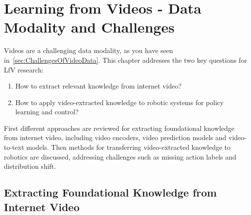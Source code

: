 \chapter{Learning from Videos - Data Modality and Challenges}
\label{chap:LearningFromVideosDataModalityAndChallenges}
\minitoc

Videos are a challenging data modality, as you have seen in~\autoref{sec:ChallengesOfVideoData}. This chapter addresses the two key questions for \ac{LfV} research:
\begin{enumerate}
    \item How to extract relevant knowledge from internet video?
    \item How to apply video-extracted knowledge to robotic systems for policy learning and control?
\end{enumerate}
First different approaches are reviewed for extracting foundational knowledge from internet video, including video encoders, video prediction models and video-to-text models. Then methods for transferring video-extracted knowledge to robotics are discussed, addressing challenges such as missing action labels and distribution shift. 




\section{Extracting Foundational Knowledge from Internet Video} 
\label{sec:ExtractingFoundationalKnowledgeFromInternetVideo}


